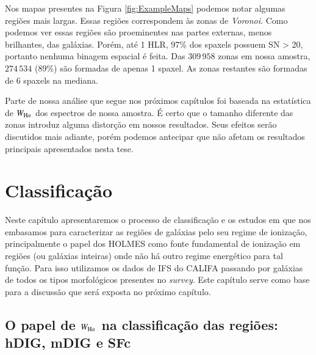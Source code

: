Nos mapas presentes na Figura \ref{fig:ExampleMaps} podemos notar algumas regiões mais largas. Essas regiões correspondem às zonas de {\em Voronoi}. Como podemos ver essas regiões são proeminentes nas partes externas, menos brilhantes, das galáxias. Porém, até 1 HLR, 97\% dos spaxels possuem SN > 20, portanto nenhuma binagem espacial é feita. Das $309\,958$ zonas em nossa amostra, $274\,534$ (89\%) são formadas de apenas 1 spaxel. As zonas restantes são formadas de 6 spaxels na mediana.

Parte de nossa análise que segue nos próximos capítulos foi baseada na estatística de $W_{\Ha}$ dos espectros de nossa amostra. É certo que o tamanho diferente das zonas introduz alguma distorção em nossos resultados. Seus efeitos serão discutidos mais adiante, porém podemos antecipar que não afetam os resultados principais apresentados nesta tese.



\chapter{Classificação}
\label{sec:DIGclass}

Neste capítulo apresentaremos o processo de classificação e os estudos em que nos embasamos para caracterizar as regiões de galáxias pelo seu regime de ionização, principalmente o papel dos HOLMES como fonte fundamental de ionização em regiões (ou galáxias inteiras) onde não há outro regime energético para tal função. Para isso utilizamos os dados de IFS do CALIFA passando por galáxias de todos os tipos morfológicos presentes no {\em survey}. Este capítulo serve como base para a discussão que será exposta no próximo capítulo.


\section{O papel de $W_{{\rm H}\alpha}$ na classificação das regiões: hDIG, mDIG e SFc}
\label{sec:DIGclass:WHa}


